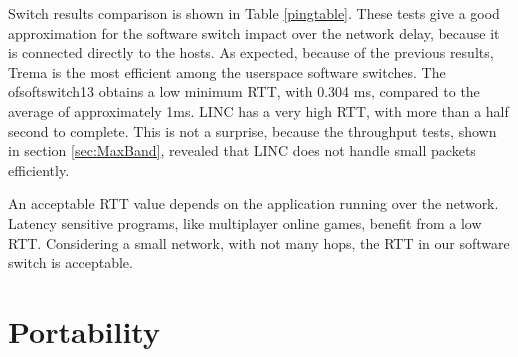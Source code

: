     Switch results comparison is shown in Table \ref{pingtable}. These tests give a good approximation for the software switch impact over the network delay, because it is connected directly to the hosts. As expected, because of the previous results, Trema is the most efficient among the userspace software switches. The ofsoftswitch13 obtains a low minimum RTT, with 0.304 ms, compared to the average of approximately 1ms. LINC has a very high RTT, with more than a half second to complete. This is not a surprise, because the throughput tests, shown in section \ref{sec:MaxBand}, revealed that LINC does not handle small packets efficiently.
    
    An acceptable RTT value depends on the application running over the network. Latency sensitive programs, like multiplayer online games, benefit from a low RTT. Considering a small network, with not many hops, the RTT in our software switch is acceptable.   

    \begin{table}[H]
    \caption{Ping Round Trip Time comparison between software switches}
    \label{pingtable}
    \end{table}

\section{Portability}

